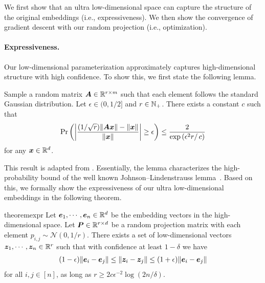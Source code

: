 We first show that an ultra low-dimensional space can capture the structure of the original embeddings (i.e., expressiveness). We then show the convergence of gradient descent with our random projection (i.e., optimization).

\paragraph{Expressiveness.}

Our low-dimensional parameterization approximately captures high-dimensional structure with high confidence. To show this, we first state the following lemma.

\begin{lemma}\label{lem:im}
      Sample a random matrix ${\bm{A}} \in {\mathbb{R}}^{r \times m}$ such that each element follows the standard Gaussian distribution. Let $\epsilon \in (0, 1/2]$ and $r \in {\mathbb{N}}_+$. There exists a constant $c$ such that \begin{align}
        \Pr\left( \left| \frac{(1/{\sqrt{r}}) \|  {\bm{A}}{\bm{x}} \| - \|{\bm{x}} \|}{\|{\bm{x}}\|} \right| \ge \epsilon \right) \le \frac{2}{ \exp\left(\epsilon^2r\right/c)}
    \end{align}
    for any ${\bm{x}} \in {\mathbb{R}}^d$. 
\end{lemma}

This result is adapted from \citet{indyk1998approximate}. Essentially, the lemma characterizes the high-probability bound of the well known Johnson–Lindenstrauss lemma~\cite{dasgupta2003elementary, matouvsek2008variants}. 
Based on this, we formally show the expressiveness of our ultra low-dimensional embeddings in the following theorem.

\begin{restatable}{theorem}{expr}\label{thm:exsitance}   
Let ${\bm{e}}_1,\cdots, {\bm{e}}_n\in\mathbb R^d$ be the embedding vectors in the high-dimensional space. Let ${\bm{P}} \in {\mathbb{R}}^{r \times d}$ be a random projection matrix with each element $p_{i,j}\sim\mathcal N(0,1/r)$. There exists a set of low-dimensional vectors ${\bm{z}}_1,\cdots, {\bm{z}}_n\in \mathbb R^r$ such that with confidence at least $1-\delta$ we have \begin{align}
        (1-\epsilon) \| {\bm{e}}_i - {\bm{e}}_j \| \le \| {\bm{z}}_i - {\bm{z}}_j \| \le (1+\epsilon) \| {\bm{e}}_i - {\bm{e}}_j \|
    \end{align}
    for all $i,j \in [n]$, as long as  $r\ge 2 c \epsilon^{-2} \log (2n/\delta)$.
\end{restatable}




